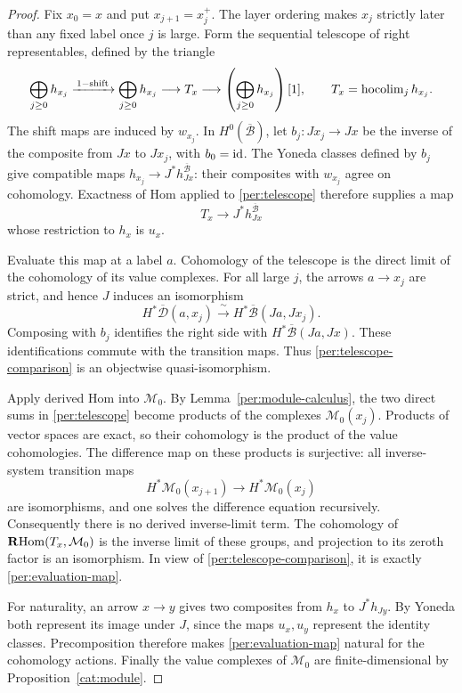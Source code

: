 \begin{proof}
Fix $x_0=x$ and put $x_{j+1}=x_j^+$.  The layer ordering makes $x_j$
strictly later than any fixed label once $j$ is large.  Form the
sequential telescope of right representables, defined by the triangle
\begin{equation}
 \bigoplus_{j\ge0}h_{x_j}
  \xrightarrow{\,1-\mathrm{shift}\,}
 \bigoplus_{j\ge0}h_{x_j}
  \longrightarrow T_x\longrightarrow
 \left(\bigoplus_{j\ge0}h_{x_j}\right)[1],
 \qquad
 T_x=\operatorname{hocolim}_j h_{x_j}.
 \label{per:telescope}
\end{equation}
The shift maps are induced by $w_{x_j}$.  In
$H^0(\overline{\mathcal B})$, let
$b_j:Jx_j\to Jx$ be the inverse of the composite from $Jx$ to $Jx_j$,
with $b_0=\operatorname{id}$.  The Yoneda classes defined by $b_j$ give compatible
maps
$h_{x_j}\to J^*h_{Jx}^{\overline{\mathcal B}}$: their composites with
$w_{x_j}$ agree on cohomology.  Exactness of Hom applied to
\eqref{per:telescope} therefore supplies a map
\begin{equation}
 T_x\longrightarrow J^*h_{Jx}^{\overline{\mathcal B}}
 \label{per:telescope-comparison}
\end{equation}
whose restriction to $h_x$ is $u_x$.

Evaluate this map at a label $a$.  Cohomology of the telescope is the
direct limit of the cohomology of its value complexes.  For all large
$j$, the arrows $a\to x_j$ are strict, and hence $J$ induces an
isomorphism
\[
 H^*\overline{\mathcal D}(a,x_j)
    \xrightarrow{\ \sim\ }
 H^*\overline{\mathcal B}(Ja,Jx_j).
\]
Composing with $b_j$ identifies the right side with
$H^*\overline{\mathcal B}(Ja,Jx)$.  These identifications commute with
the transition maps.  Thus \eqref{per:telescope-comparison} is an
objectwise quasi-isomorphism.

Apply derived Hom into $\mathcal M_0$.  By
Lemma~\ref{per:module-calculus}, the two direct sums in
\eqref{per:telescope} become products of the complexes
$\mathcal M_0(x_j)$.  Products of vector spaces are exact, so their
cohomology is the product of the value cohomologies.  The difference
map on these products is surjective: all inverse-system transition
maps
\[
 H^*\mathcal M_0(x_{j+1})\longrightarrow H^*\mathcal M_0(x_j)
\]
are isomorphisms, and one solves the difference equation recursively.
Consequently there is no derived inverse-limit term.  The cohomology
of $\operatorname{\mathbf R Hom}(T_x,\mathcal M_0)$ is the inverse limit of these groups,
and projection to its zeroth factor is an isomorphism.  In view of
\eqref{per:telescope-comparison}, it is exactly
\eqref{per:evaluation-map}.

For naturality, an arrow $x\to y$ gives two composites from $h_x$ to
$J^*h_{Jy}$.  By Yoneda both represent its image under $J$, since the
maps $u_x,u_y$ represent the identity classes.  Precomposition
therefore makes \eqref{per:evaluation-map} natural for the
cohomology actions.  Finally the value complexes of $\mathcal M_0$
are finite-dimensional by Proposition~\ref{cat:module}.
\end{proof}

